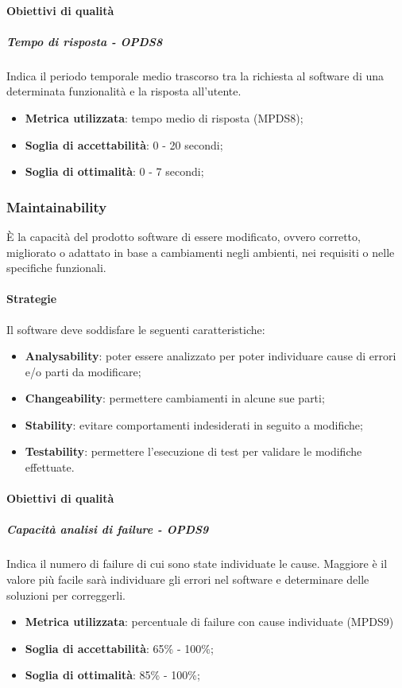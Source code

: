 \documentclass[PdQ.tex]{subfiles}
\begin{document}
			\paragraph{Obiettivi di qualità}
			
				\subparagraph{Tempo di risposta - OPDS8}
				Indica il periodo temporale medio trascorso tra la richiesta al software di una determinata funzionalità e la risposta all'utente.
				\begin{itemize}
					\item \textbf{Metrica utilizzata}: tempo medio di risposta (MPDS8);
					\item \textbf{Soglia di accettabilità}: 0 - 20 secondi;
					\item \textbf{Soglia di ottimalità}: 0 - 7 secondi;
				\end{itemize}
		
		\subsubsection{Maintainability}
		È la capacità del prodotto software di essere modificato, ovvero corretto, migliorato o adattato in base a cambiamenti negli ambienti, nei requisiti o
		nelle specifiche funzionali.
		
			\paragraph{Strategie}
			Il software deve soddisfare le seguenti caratteristiche:
			\begin{itemize}
				\item \textbf{Analysability}: poter essere analizzato per poter individuare cause di errori e/o parti da modificare;
				\item \textbf{Changeability}: permettere cambiamenti in alcune sue parti;
				\item \textbf{Stability}: evitare comportamenti indesiderati in seguito a modifiche;
				\item \textbf{Testability}: permettere l'esecuzione di test per validare le modifiche effettuate.
			\end{itemize}
			
			\paragraph{Obiettivi di qualità}
			
				\subparagraph{Capacità analisi di failure - OPDS9}
				Indica il numero di failure di cui sono state individuate le cause.  Maggiore è il valore più facile sarà individuare gli errori nel software 
				e determinare delle soluzioni per correggerli.
				\begin{itemize}
					\item \textbf{Metrica utilizzata}: percentuale di failure con cause individuate (MPDS9)
					\item \textbf{Soglia di accettabilità}: 65\% - 100\%;
					\item \textbf{Soglia di ottimalità}: 85\% - 100\%;
				\end{itemize}
				
\end{document}
